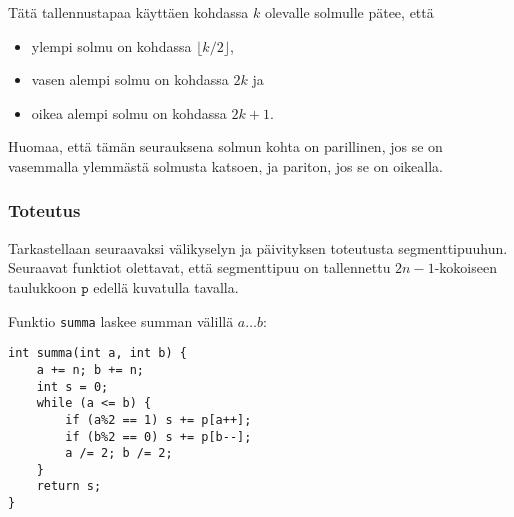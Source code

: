 \begin{center}
\end{center}
Tätä tallennustapaa käyttäen kohdassa $k$
olevalle solmulle pätee, että
\begin{itemize}
\item ylempi solmu on kohdassa $\lfloor k/2 \rfloor$,
\item vasen alempi solmu on kohdassa $2k$ ja
\item oikea alempi solmu on kohdassa $2k+1$.
\end{itemize}
Huomaa, että tämän seurauksena solmun kohta on parillinen,
jos se on vasemmalla ylemmästä solmusta katsoen,
ja pariton, jos se on oikealla.

\subsubsection{Toteutus}

Tarkastellaan seuraavaksi välikyselyn ja päivityksen
toteutusta segmenttipuuhun.
Seuraavat funktiot olettavat, että segmenttipuu
on tallennettu $2n-1$-kokoi\-seen taulukkoon $\texttt{p}$
edellä kuvatulla tavalla.

Funktio \texttt{summa} laskee summan
välillä $a \ldots b$:

\begin{lstlisting}
int summa(int a, int b) {
    a += n; b += n;
    int s = 0;
    while (a <= b) {
        if (a%2 == 1) s += p[a++];
        if (b%2 == 0) s += p[b--];
        a /= 2; b /= 2;
    }
    return s;
}
\end{lstlisting}

